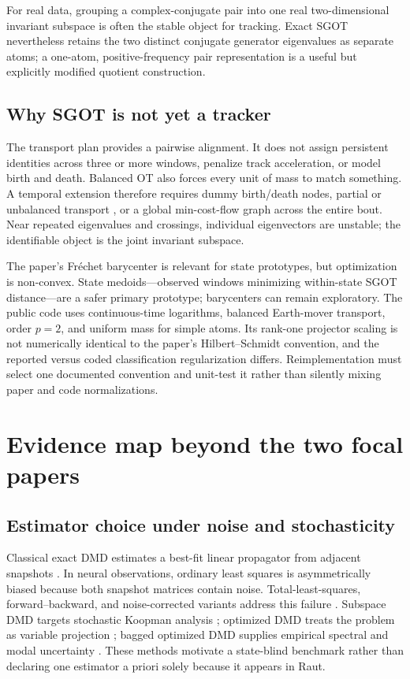 \documentclass[11pt,a4paper]{article}
\begin{document}
For real data, grouping a complex-conjugate pair into one real two-dimensional invariant subspace is often the stable object for tracking. Exact SGOT nevertheless retains the two distinct conjugate generator eigenvalues as separate atoms; a one-atom, positive-frequency pair representation is a useful but explicitly modified quotient construction.

\subsection{Why SGOT is not yet a tracker}

The transport plan provides a pairwise alignment. It does not assign persistent identities across three or more windows, penalize track acceleration, or model birth and death. Balanced OT also forces every unit of mass to match something. A temporal extension therefore requires dummy birth/death nodes, partial or unbalanced transport \citep{chizat2018}, or a global min-cost-flow graph across the entire bout. Near repeated eigenvalues and crossings, individual eigenvectors are unstable; the identifiable object is the joint invariant subspace.

The paper's Fr\'echet barycenter is relevant for state prototypes, but optimization is non-convex. State medoids---observed windows minimizing within-state SGOT distance---are a safer primary prototype; barycenters can remain exploratory. The public code uses continuous-time logarithms, balanced Earth-mover transport, order $p=2$, and uniform mass for simple atoms. Its rank-one projector scaling is not numerically identical to the paper's Hilbert--Schmidt convention, and the reported versus coded classification regularization differs. Reimplementation must select one documented convention and unit-test it rather than silently mixing paper and code normalizations.

\section{Evidence map beyond the two focal papers}

\subsection{Estimator choice under noise and stochasticity}

Classical exact DMD estimates a best-fit linear propagator from adjacent snapshots \citep{schmid2010,tu2014}. In neural observations, ordinary least squares is asymmetrically biased because both snapshot matrices contain noise. Total-least-squares, forward--backward, and noise-corrected variants address this failure \citep{dawson2016,hemati2017}. Subspace DMD targets stochastic Koopman analysis \citep{takeishi2017}; optimized DMD treats the problem as variable projection \citep{askham2018}; bagged optimized DMD supplies empirical spectral and modal uncertainty \citep{sashidhar2022}. These methods motivate a state-blind benchmark rather than declaring one estimator a priori solely because it appears in Raut.
\end{document}
